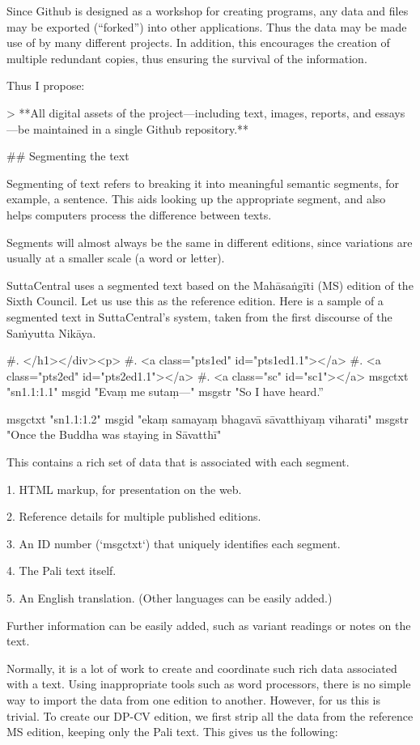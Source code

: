 \documentclass[11pt, openany,a5paper]{article}
\begin{document}
\begin{markdown}
Since Github is designed as a workshop for creating programs, any data and files may be exported (“forked”) into other applications. Thus the data may be made use of by many different projects. In addition, this encourages the creation of multiple redundant copies, thus ensuring the survival of the information.

Thus I propose:

> **All digital assets of the project—including text, images, reports, and essays—be maintained in a single Github repository.**

## Segmenting the text

Segmenting of text refers to breaking it into meaningful semantic segments, for example, a sentence. This aids looking up the appropriate segment, and also helps computers process the difference between texts.

Segments will almost always be the same in different editions, since variations are usually at a smaller scale (a word or letter).

SuttaCentral uses a segmented text based on the Mahāsaṅgīti (MS) edition of the Sixth Council. Let us use this as the reference edition. Here is a sample of a segmented text in SuttaCentral’s system, taken from the first discourse of the Saṁyutta Nikāya.

    #. </h1></div><p>
    #. <a class="pts1ed" id="pts1ed1.1"></a>
    #. <a class="pts2ed" id="pts2ed1.1"></a>
    #. <a class="sc" id="sc1"></a>
    msgctxt "sn1.1:1.1"
    msgid "Evaṃ me sutaṃ—​"
    msgstr "So I have heard.”

    msgctxt "sn1.1:1.2"
    msgid "ekaṃ samayaṃ bhagavā sāvatthiyaṃ viharati"
    msgstr "Once the Buddha was staying in Sāvatthī"

This contains a rich set of data that is associated with each segment.

1. HTML markup, for presentation on the web.

2. Reference details for multiple published editions.

3. An ID number (`msgctxt`) that uniquely identifies each segment.

4. The Pali text itself.

5. An English translation. (Other languages can be easily added.)

Further information can be easily added, such as variant readings or notes on the text.

Normally, it is a lot of work to create and coordinate such rich data associated with a text. Using inappropriate tools such as word processors, there is no simple way to import the data from one edition to another. However, for us this is trivial. To create our DP-CV edition, we first strip all the data from the reference MS edition, keeping only the Pali text. This gives us the following:


\end{markdown}
\end{document}

